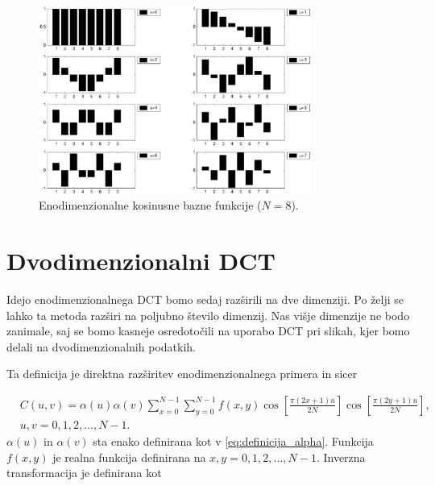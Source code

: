 \documentclass[a4paper,12pt,openright]{book}
\begin{document}
\begin{figure}[ht] %
\begin{center}
\includegraphics[width=0.8\textwidth]{slike/bazne_funkcije_1D.pdf}
\end{center}
\caption{Enodimenzionalne kosinusne bazne funkcije ($N=8$).}
\label{1D_bazne_funkcije}
\end{figure}



\section{Dvodimenzionalni DCT} %

Idejo enodimenzionalnega DCT bomo sedaj razširili na dve dimenziji. Po želji se lahko ta metoda razširi na poljubno število dimenzij. Nas višje dimenzije ne bodo zanimale, saj se bomo kasneje osredotočili na uporabo DCT pri slikah, kjer bomo delali na dvodimenzionalnih podatkih. \par
Ta definicija je direktna razširitev enodimenzionalnega primera in sicer

\begin{equation}
    \begin{aligned}
    &C(u,v) = \alpha(u) \alpha(v) \sum_{x=0}^{N-1}\sum_{y=0}^{N-1} f(x,y)
    \cos\left[\frac{\pi(2x+1)u}{2N}\right]
    \cos\left[\frac{\pi(2y+1)u}{2N}\right], \\
    &u,v = 0,1,2,\ldots,N-1.
    \end{aligned}
\label{eq:2D-DCT}
\end{equation}
$\alpha(u)$ in $\alpha(v)$ sta enako definirana kot v \ref{eq:definicija_alpha}. Funkcija $f(x,y)$ je realna funkcija definirana na $x,y = 0,1,2,\ldots,N-1$. Inverzna transformacija je definirana kot
\end{document}
